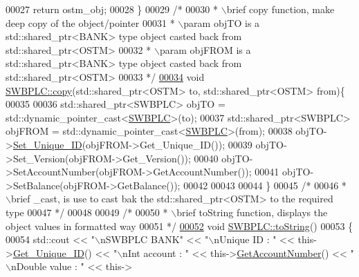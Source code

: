 \begin{DoxyCode}
00027     \textcolor{keywordflow}{return} ostm\_obj;
00028 \}
00029 \textcolor{comment}{/*}
00030 \textcolor{comment}{ * \(\backslash\)brief copy function, make deep copy of the object/pointer}
00031 \textcolor{comment}{ * \(\backslash\)param objTO is a std::shared\_ptr<BANK> type object casted back from std::shared\_ptr<OSTM>}
00032 \textcolor{comment}{ * \(\backslash\)param objFROM is a std::shared\_ptr<BANK> type object casted back from std::shared\_ptr<OSTM>}
00033 \textcolor{comment}{ */}
\hypertarget{_s_w_b_p_l_c_8cpp_source.tex_l00034}{}\hyperlink{class_s_w_b_p_l_c_a9468640482a6cfb9bfb4115fc59191d5_a9468640482a6cfb9bfb4115fc59191d5}{00034} \textcolor{keywordtype}{void} \hyperlink{class_s_w_b_p_l_c_a9468640482a6cfb9bfb4115fc59191d5_a9468640482a6cfb9bfb4115fc59191d5}{SWBPLC::copy}(std::shared\_ptr<OSTM> to, std::shared\_ptr<OSTM> from)\{
00035 
00036     std::shared\_ptr<SWBPLC> objTO = std::dynamic\_pointer\_cast<\hyperlink{class_s_w_b_p_l_c}{SWBPLC}>(to);
00037     std::shared\_ptr<SWBPLC> objFROM = std::dynamic\_pointer\_cast<\hyperlink{class_s_w_b_p_l_c}{SWBPLC}>(from);
00038     objTO->\hyperlink{class_o_s_t_m_ab5019a32185631c08abbf826422f2d93_ab5019a32185631c08abbf826422f2d93}{Set\_Unique\_ID}(objFROM->Get\_Unique\_ID());
00039     objTO->Set\_Version(objFROM->Get\_Version());
00040     objTO->SetAccountNumber(objFROM->GetAccountNumber());
00041     objTO->SetBalance(objFROM->GetBalance());
00042 
00043     
00044 \}
00045 \textcolor{comment}{/*}
00046 \textcolor{comment}{ * \(\backslash\)brief \_cast, is use to cast bak the std::shared\_ptr<OSTM> to the required type}
00047 \textcolor{comment}{ */}
00048 
00049 \textcolor{comment}{/*}
00050 \textcolor{comment}{ *  \(\backslash\)brief toString function, displays the object values in formatted way}
00051 \textcolor{comment}{ */}
\hypertarget{_s_w_b_p_l_c_8cpp_source.tex_l00052}{}\hyperlink{class_s_w_b_p_l_c_a761c77b5a204b4ae05ffb01bd602c3c2_a761c77b5a204b4ae05ffb01bd602c3c2}{00052} \textcolor{keywordtype}{void} \hyperlink{class_s_w_b_p_l_c_a761c77b5a204b4ae05ffb01bd602c3c2_a761c77b5a204b4ae05ffb01bd602c3c2}{SWBPLC::toString}()
00053 \{
00054      std::cout << \textcolor{stringliteral}{"\(\backslash\)nSWBPLC BANK"} << \textcolor{stringliteral}{"\(\backslash\)nUnique ID : "} << this->\hyperlink{class_o_s_t_m_a5a01a8b98d16b1d1904ecf9356e7b71d_a5a01a8b98d16b1d1904ecf9356e7b71d}{Get\_Unique\_ID}() << \textcolor{stringliteral}{"\(\backslash\)nInt
       account : "} << this->\hyperlink{class_s_w_b_p_l_c_a1a997f6d333e5021970e50605431d7df_a1a997f6d333e5021970e50605431d7df}{GetAccountNumber}() << \textcolor{stringliteral}{"\(\backslash\)nDouble value : "} << this->

\end{DoxyCode}
